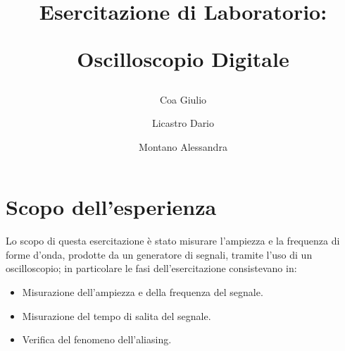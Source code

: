 \documentclass[a4paper]{article}
\title{
		\begin{center}
			Esercitazione di Laboratorio:
		\end{center}
		\newline
		\begin{center}
			Oscilloscopio Digitale
		\end{center}
	}
\author{
			Coa Giulio
			\and
			Licastro Dario
			\and
			Montano Alessandra
		}
\begin{document}
	\begin{titlingpage}
		\maketitle
	\end{titlingpage}
	\newpage
	\section{Scopo dell'esperienza}
		Lo scopo di questa esercitazione è stato misurare l'ampiezza e la frequenza di forme d’onda, prodotte da un generatore di segnali, tramite l’uso di un oscilloscopio; in particolare le fasi dell'esercitazione consistevano in:
		\begin{itemize}
			\item Misurazione dell'ampiezza e della frequenza del segnale.
			\item Misurazione del tempo di salita del segnale.
			\item Verifica del fenomeno dell’aliasing.
		\end{itemize}
\end{document}
